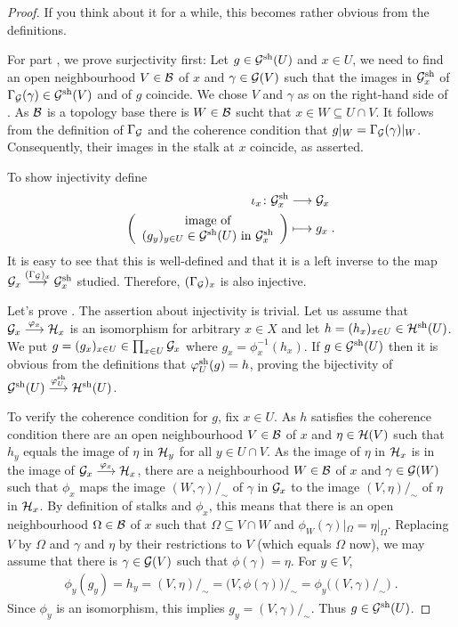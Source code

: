 \documentclass[a4paper,parskip=half,numbers=enddot, DIV=12]{scrreprt}
\begin{document}
\begin{proof}
	 If you think about it for a while, this becomes rather obvious from the definitions.
	
	For part , we prove surjectivity first: Let $g\in\mathcal{G}^{\mathrm{sh}}(U)$ and $x\in U$, we need to find an open neighbourhood $V\in \mathcal{B}$ of $x$ and $\gamma\in \mathcal{G}(V)$ such that the images in $\mathcal{G}^{\mathrm{sh}}_x$ of $\Gamma_{\mathcal{G}}(\gamma)\in \mathcal{G}^{\mathrm{sh}}(V)$ and of $g$ coincide. We chose $V$ and $\gamma$ as on the right-hand side of . As $\mathcal{B}$ is a topology base there is $W\in\mathcal{B}$ sucht that $x\in W\subseteq U\cap V$. It follows from the definition of $\Gamma_{\mathcal{G}}$ and the coherence condition that $g|_W = \Gamma_{\mathcal{G}}(\gamma)|_W$. Consequently, their images in the stalk at $x$ coincide, as asserted.
	
	To show injectivity define
	\begin{align*}
	    \iota_x\colon \Gg^\sh_x &\morphism \Gg_x\\
	    \bigg(\begin{array}{c}
		    \text{image of}\\
		    (g_y)_{y\in U} \in \Gg^\sh(U) \text{ in } \Gg^\sh_x 
	    \end{array}\bigg) &\longmapsto g_x\;.
	\end{align*}
	It is easy to see that this is well-defined and that it is a left inverse to the map $\Gg_x\morphism[(\Gamma_{\Gg})_x] \Gg^\sh_x$ studied. Therefore, $(\Gamma_{\mathcal{G}})_x$  is also injective.
	
	Let's prove . The assertion about injectivity is trivial. Let us assume that $\Gg_x\morphism[\phi_x]\Hh_x$ is an isomorphism for arbitrary $x\in X$ and let $h=(h_x)_{x\in U}\in \mathcal{H}^{\mathrm{sh}}(U)$. We put $g=(g_x)_{x\in U} \in \prod_{x\in U}\mathcal{G}_x$ where $g_x = \phi_x^{-1} (h_x)$. If $g\in \mathcal{G}^{\mathrm{sh}}(U)$ then it is obvious from the definitions that $\varphi_U^{\mathrm{sh}}(g) = h$, proving the bijectivity of $\Gg^\sh(U) \morphism[\phi_U^\sh] \Hh^\sh(U)$.
	
	To verify the coherence condition for $g$, fix $x\in U$. As $h$ satisfies the coherence condition there are an open neighbourhood $V\in\mathcal{B}$ of $x$ and $\eta\in\mathcal{H}(V)$ such that $h_y$ equals the image of $\eta$ in $\mathcal{H}_y$ for all $y\in U\cap V$. As the image of $\eta$ in $\mathcal{H}_x$ is in the image of $\Gg_x\morphism[\phi_x]\Hh_x$, there are a neighbourhood $W\in\mathcal{B}$ of $x$ and $\gamma\in\mathcal{G}(W)$ such that $\phi_x$ maps the image $(W,\gamma)/_\sim$ of $\gamma$ in $\mathcal{G}_x$ to the image $(V,\eta)/_\sim$ of $\eta$ in $\mathcal{H}_x$. By definition of stalks and $\phi_x$, this means that there is an open neighbourhood $\Omega\in\mathcal{B}$ of $x$ such that $\Omega\subseteq V\cap W$ and $ \phi_W(\gamma)|_\Omega = \eta|_\Omega$. Replacing $V$ by $\Omega$ and $\gamma$ and $\eta$ by their restrictions to $V$ (which equals $\Omega$ now), we may assume that there is $\gamma\in\mathcal{G}(V)$ such that $\phi(\gamma) = \eta$. For $y\in V$, \begin{align*}
		\phi_y(g_y) = h_y=(V,\eta)/_\sim = \big(V,\phi(\gamma)\big)/_\sim = \phi_y\big((V,\gamma)/_\sim\big)\;.
	\end{align*}
	Since $\phi_y$ is an isomorphism, this implies $g_y = (V,\gamma)/_\sim$. Thus $g\in \mathcal{G}^{\mathrm{sh}}(U)$.
	

\end{proof}
\end{document}
